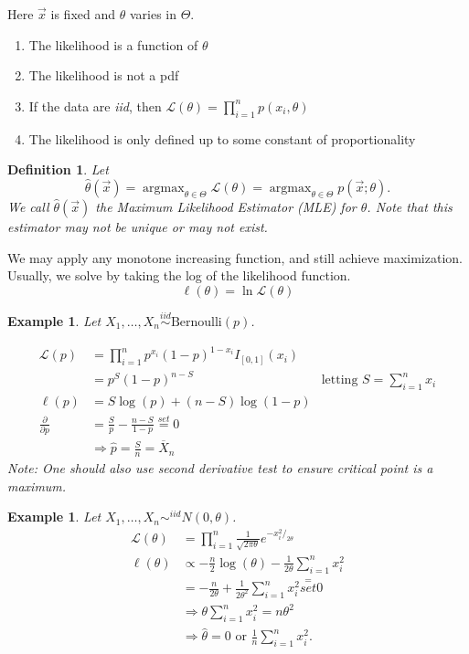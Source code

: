 \documentclass[10pt]{article}
\newtheorem{definition}[def]{Definition}
\newtheorem{example}[ex]{Example}
\DeclareMathOperator*{\argmax}{argmax}
\renewcommand{\bar}{\overline}
\renewcommand{\hat}{\widehat}
\begin{document}
Here $\vec{x}$ is fixed and $\theta$ varies in $\Theta$.
\begin{enumerate}
\item The likelihood is a function of $\theta$
\item The likelihood is not a pdf
\item If the data are {\em iid}, then $\mathcal{L}(\theta) = \prod_{i=1}^{n}p(x_i,\theta)$
\item The likelihood is only defined up to some constant of proportionality
\end{enumerate}
\begin{definition}
  Let 
  \[
  \hat{\theta}(\vec{x}) = \argmax_{\theta \in
    \Theta}\mathcal{L}(\theta) = \argmax_{\theta\in\Theta}
  p(\vec{x};\theta).
  \]
  We call $\hat{\theta}(\vec{x})$ the {\em Maximum Likelihood
    Estimator (MLE)} for $\theta$. Note that this estimator may not be unique or
  may not exist.
\end{definition}
We may apply any monotone increasing function, and still achieve
maximization. Usually, we solve by taking the log of the likelihood
function. 
\begin{equation}
  \ell(\theta) = \ln \mathcal{L}(\theta)
\end{equation}


\begin{example}
  Let $X_1,\ldots, X_n \overset{iid}{\sim} \mbox{Bernoulli}(p)$.

  \begin{align*}
    \mathcal{L} (p) &=
     \prod_{i=1}^n p^{x_i} (1-p)^{1-x_i} I_{[0,1]}(x_i)\\
    &= p^{S}(1-p)^{n-S} & \mbox{letting }S = \sum_{i=1}^{n}x_i\\
    \ell(p) &= S\log{(p)}+ (n-S)\log{(1-p)}\\
    \frac{\partial}{\partial{p}} &= \frac{S}{p} - \frac{n-S}{1-p}
    \overset{set}{=} 0\\
    &\Rightarrow \hat{p} = \frac{S}{n} = \bar{X}_n
  \end{align*}
  Note: One should also use second derivative test to
    ensure critical point is a maximum.
\end{example}

\begin{example}
  Let $X_1,\ldots,X_n\sim^{iid} N(0,\theta)$.
  \begin{align*}
    \mathcal{L}(\theta) &=
    \prod_{i=1}^{n}\frac{1}{\sqrt{2\pi\theta}}e^{-x_{i}^{2}/_{2\theta}}\\
    \ell(\theta)&\propto -\frac{n}{2}\log{(\theta)}-\frac{1}{2\theta}\sum_{i=1}^{n}x_{i}^{2}\\
    &= -\frac{n}{2\theta}+\frac{1}{2\theta^{2}}\sum_{i=1}^{n}x_{i}^{2}
    \overset{=}{set} 0\\
    &\Rightarrow\theta\sum_{i=1}^{n}x_{i}^{2} = n\theta^{2}\\
    &\Rightarrow\hat{\theta} = 0 \mbox{ or }
    \frac{1}{n}\sum_{i=1}^{n}x_{i}^{2}.
  \end{align*}
\end{example}
\end{document}
